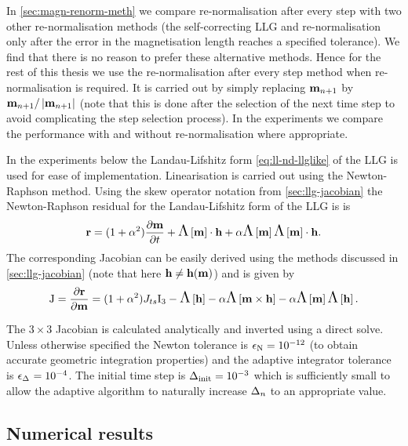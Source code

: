 In \cref{sec:magn-renorm-meth} we compare re-normalisation after every step with two other re-normalisation methods (the self-correcting LLG and re-normalisation only after the error in the magnetisation length reaches a specified tolerance).
We find that there is no reason to prefer these alternative methods.
Hence for the rest of this thesis we use the re-normalisation after every step method when re-normalisation is required.
It is carried out by simply replacing $\boldsymbol{\mathrm{m}}_{n+1}$ by $\boldsymbol{\mathrm{m}}_{n+1}/\left|{\boldsymbol{\mathrm{m}}_{n+1}} \right|$ (note that this is done after the selection of the next time step to avoid complicating the step selection process).
In the experiments we compare the performance with and without re-normalisation where appropriate.

In the experiments below the Landau-Lifshitz form \cref{eq:ll-nd-llglike} of the LLG is used for ease of implementation.
Linearisation is carried out using the Newton-Raphson method.
Using the skew operator notation from \cref{sec:llg-jacobian} the Newton-Raphson residual for the Landau-Lifshitz form of the LLG is is
\begin{equation}
  \label{eq:r-ode-llg}
  \boldsymbol{\mathrm{r}} = (1 + \alpha^2) \frac{\partial \boldsymbol{\mathrm{m}}}{\partial t} + \text{\Large{$\Lambda$}}\left[ \boldsymbol{\mathrm{m}} \right] \cdot \boldsymbol{\mathrm{h}} + \alpha \text{\Large{$\Lambda$}}\left[ \boldsymbol{\mathrm{m}} \right]\text{\Large{$\Lambda$}}\left[ \boldsymbol{\mathrm{m}} \right] \cdot \boldsymbol{\mathrm{h}}.
\end{equation}
The corresponding Jacobian can be easily derived using the methods discussed in \cref{sec:llg-jacobian} (note that here $\boldsymbol{\mathrm{h}} \neq \boldsymbol{\mathrm{h}}(\boldsymbol{\mathrm{m}})$) and is given by
\begin{equation}
  \mathrm{J} = \frac{\partial \boldsymbol{\mathrm{r}}}{\partial \boldsymbol{\mathrm{m}}} = (1 + \alpha^2) J_{ts} \mathrm{I}_3 - \text{\Large{$\Lambda$}}\left[ \boldsymbol{\mathrm{h}} \right] - \alpha \text{\Large{$\Lambda$}}\left[  \boldsymbol{\mathrm{m}} \times \boldsymbol{\mathrm{h}}  \right]
  - \alpha \text{\Large{$\Lambda$}}\left[ \boldsymbol{\mathrm{m}} \right] \text{\Large{$\Lambda$}}\left[ \boldsymbol{\mathrm{h}} \right].
  \label{eq:J-ode-llg}
\end{equation}

The $3 \times 3$ Jacobian is calculated analytically and inverted using a direct solve.
Unless otherwise specified the Newton tolerance is $\epsilon_{\mathrm{N}} = 10^{-12}$ (to obtain accurate geometric integration properties) and the adaptive integrator tolerance is $\epsilon_{\Delta_{}} = 10^{-4}$.
The initial time step is $\Delta_{\mathrm{init}} = 10^{-3}$ which is sufficiently small to allow the adaptive algorithm to naturally increase $\Delta_{n}$ to an appropriate value.


\subsection{Numerical results}
\label{sec:aimr-llgode-numerical-results}

